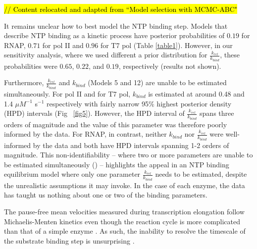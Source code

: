 \documentclass[10pt,letterpaper]{article}
\begin{document}
\textcolor{red}{\hl{// Content relocated and adapted from ``Model selection with MCMC-ABC"}}


It remains unclear how to best model the NTP binding step. Models that describe NTP binding as a kinetic process have posterior probabilities of $0.19$ for RNAP, $0.71$ for pol II and $0.96$ for T7 pol (Table \ref{table1}). However, in our sensitivity analysis, where we used different a prior distribution for $\frac{k_{rel}}{k_{bind}}$, these probabilities were $0.65$, $0.22$, and $0.19$, respectively (results not shown).


Furthermore, $\frac{k_{rel}}{k_{bind}}$ and $k_{bind}$ (Models 5 and 12) are unable to be estimated simultaneously. For pol II and for T7 pol, $k_{bind}$ is estimated at around 0.48 and 1.4 $\mu M^{-1}$ s$^{-1}$ respectively with fairly narrow 95\% highest posterior density (HPD) intervals (Fig ~\ref{fig5}). However, the HPD interval of $\frac{k_{rel}}{k_{bind}}$ spans three orders of magnitude and the value of this parameter was therefore poorly informed by the data. For RNAP, in contrast, neither $k_{bind}$ nor $\frac{k_{rel}}{k_{bind}}$ were well-informed by the data and both have HPD intervals spanning 1-2 orders of magnitude. This non-identifiability -- where two or more parameters are unable to be estimated simultaneously () -- highlights the appeal in an NTP binding equilibrium model where only one parameter $\frac{k_{rel}}{k_{bind}}$ needs to be estimated, despite the unrealistic assumptions it may invoke. In the case of each enzyme, the data has taught us nothing about one or two of the binding parameters.



The pause-free mean velocities measured during transcription elongation follow Michaelis-Menten kinetics
even though the reaction cycle is more complicated than that of a simple enzyme \cite{wong2018structural}. As such, the inability to resolve the timescale of the substrate binding step is unsurprising \cite{briggs1925note, english2006ever, schnell2014validity}.




\end{document}
